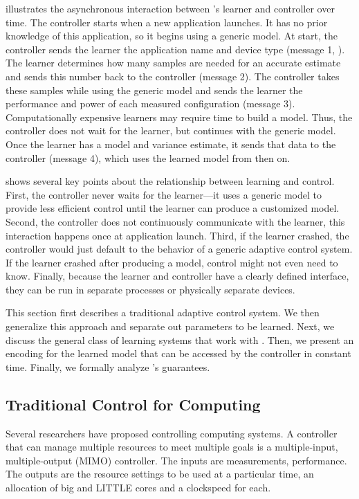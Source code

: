  illustrates the asynchronous interaction between
\SYSTEM{}'s learner and controller over time. The controller starts
when a new application launches.  It has no prior knowledge of this
application, so it begins using a generic model.  At start, the
controller sends the learner the application name and device type
(message 1, ).  The learner determines how many
samples are needed for an accurate estimate and sends this number back
to the controller (message 2).  The controller takes these samples
while using the generic model and sends the learner the performance
and power of each measured configuration (message 3).  Computationally
expensive learners may require time to build a model.  Thus, the
controller does not wait for the learner, but continues with the
generic model.  Once the learner has a model and variance estimate, it
sends that data to the controller (message 4), which uses the learned
model from then on.

 shows several key points about the relationship
between learning and control.  First, the controller never waits for
the learner---it uses a generic model to provide less efficient
control until the learner can produce a customized model. Second, the
controller does not continuously communicate with the learner, this
interaction happens once at application launch.  Third, if the learner
crashed, the controller would just default to the behavior of a
generic adaptive control system.  If the learner crashed after
producing a model, control might not even need to know.  Finally,
because the learner and controller have a clearly defined interface,
they can be run in separate processes or physically separate devices.

This section first describes a traditional adaptive control system.
We then generalize this approach and separate out parameters to be
learned.  Next, we discuss the general class of learning systems that
work with \SYSTEM{}.  Then, we present an encoding for the learned
model that can be accessed by the controller in constant time.
Finally, we formally analyze \SYSTEM{}'s guarantees.


\subsection{Traditional Control for Computing}
Several researchers have proposed controlling computing systems.  A
controller that can manage multiple resources to meet multiple goals
is a multiple-input, multiple-output (MIMO) controller.  The inputs
are measurements, \eg{} performance.  The outputs are the resource
settings to be used at a particular time, \eg{} an allocation of big
and LITTLE cores and a clockspeed for each.

